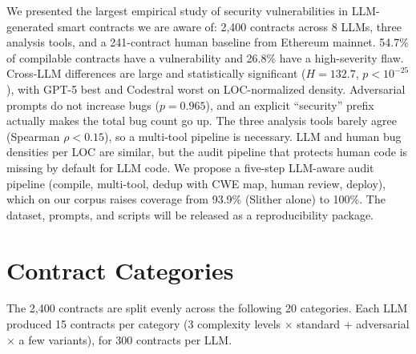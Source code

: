 \documentclass[11pt]{article}
\begin{document}
We presented the largest empirical study of security vulnerabilities in LLM-generated smart contracts we are aware of: 2,400 contracts across 8 LLMs, three analysis tools, and a 241-contract human baseline from Ethereum mainnet. 54.7\% of compilable contracts have a vulnerability and 26.8\% have a high-severity flaw. Cross-LLM differences are large and statistically significant ($H=132.7$, $p<10^{-25}$), with GPT-5 best and Codestral worst on LOC-normalized density. Adversarial prompts do not increase bugs ($p=0.965$), and an explicit ``security'' prefix actually makes the total bug count go up. The three analysis tools barely agree (Spearman $\rho<0.15$), so a multi-tool pipeline is necessary. LLM and human bug densities per LOC are similar, but the audit pipeline that protects human code is missing by default for LLM code. We propose a five-step LLM-aware audit pipeline (compile, multi-tool, dedup with CWE map, human review, deploy), which on our corpus raises coverage from 93.9\% (Slither alone) to 100\%. The dataset, prompts, and scripts will be released as a reproducibility package.

\appendix
\section{Contract Categories}
\label{app:categories}

The 2{,}400 contracts are split evenly across the following 20 categories. Each LLM produced 15 contracts per category (3 complexity levels $\times$ standard + adversarial $\times$ a few variants), for 300 contracts per LLM.
\end{document}
